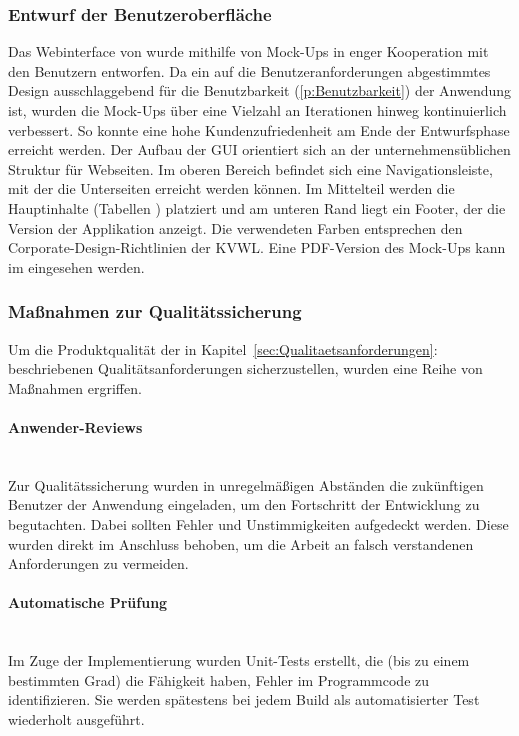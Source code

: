\subsubsection{Entwurf der Benutzeroberfläche}
\label{sec:Benutzeroberflaeche}
Das Webinterface von \projektName wurde mithilfe von Mock-Ups in enger Kooperation mit den Benutzern entworfen. Da ein auf die Benutzeranforderungen abgestimmtes Design ausschlaggebend für die Benutzbarkeit (\ref{p:Benutzbarkeit}) der Anwendung ist, wurden die Mock-Ups über eine Vielzahl an Iterationen hinweg kontinuierlich verbessert. So konnte eine hohe Kundenzufriedenheit am Ende der Entwurfsphase erreicht werden. Der Aufbau der \ac{GUI} orientiert sich an der unternehmensüblichen Struktur für Webseiten. Im oberen Bereich befindet sich eine Navigationsleiste, mit der die Unterseiten erreicht werden können. Im Mittelteil werden die Hauptinhalte (Tabellen \etc) platziert und am unteren Rand liegt ein Footer, der die Version der Applikation anzeigt. Die verwendeten Farben entsprechen den Corporate-Design-Richtlinien der \ac{KVWL}. Eine PDF-Version des Mock-Ups kann im  eingesehen werden.

\subsubsection{Maßnahmen zur Qualitätssicherung}
\label{sec:Qualitaetssicherung}
Um die Produktqualität der in Kapitel~\ref{sec:Qualitaetsanforderungen}:  beschriebenen Qualitätsanforderungen sicherzustellen, wurden eine Reihe von Maßnahmen ergriffen.

\paragraph{Anwender-Reviews} ~\\
\label{p:Reviews}
Zur Qualitätssicherung wurden in unregelmäßigen Abständen die zukünftigen Benutzer der Anwendung eingeladen, um den Fortschritt der Entwicklung zu begutachten. Dabei sollten Fehler und Unstimmigkeiten aufgedeckt werden. Diese wurden direkt im Anschluss behoben, um \zB die Arbeit an falsch verstandenen Anforderungen zu vermeiden.

\paragraph{Automatische Prüfung} ~\\
\label{p:Pruefung}
Im Zuge der Implementierung wurden Unit-Tests erstellt, die (bis zu einem bestimmten Grad) die Fähigkeit haben, Fehler im Programmcode zu identifizieren. Sie werden spätestens bei jedem Build als automatisierter Test wiederholt ausgeführt.

